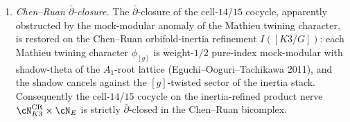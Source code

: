 \begin{theorem}
\begin{enumerate}[leftmargin=2em]
 $K(1)$-orbit, the residual class reduces to the single Heegner-divisor
 Borcherds-lift class $c^{\Delta_{5}}$, valued by the universal
 Borcherds weight formula as $\kBKM(\Delta_{5})=
 c_{1}(0)/2=5$.
 \item \emph{Chen--Ruan $\bar\partial$-closure.} The $\bar\partial$-closure
 of the cell-$14$/$15$ cocycle, apparently obstructed by the
 mock-modular anomaly of the Mathieu twining character, is restored on
 the Chen--Ruan orbifold-inertia refinement $I([K3/G])$: each
 Mathieu twining character $\phi_{[g]}$ is weight-$1/2$ pure-index
 mock-modular with shadow-theta of the $A_{1}$-root lattice
 (Eguchi--Ooguri--Tachikawa 2011), and the shadow cancels against the
 $[g]$-twisted sector of the inertia stack. Consequently the
 cell-$14$/$15$ cocycle on the inertia-refined product nerve
 $\cN_{K3}^{\mathrm{CR}}\times\cN_{E}$ is strictly
 $\bar\partial$-closed in the Chen--Ruan bicomplex.
\end{enumerate}
\end{theorem}


